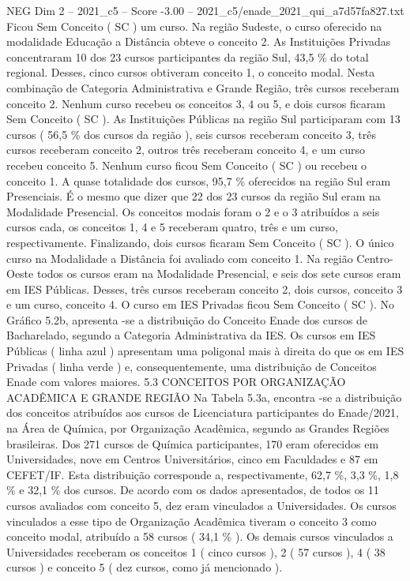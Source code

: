 \begin{textsample}{NEG Dim 2 – 2021\_c5 – Score -3.00 – 2021\_c5/enade\_2021\_qui\_a7d57fa827.txt}
Ficou Sem Conceito ( SC ) um curso.
Na região Sudeste, o curso oferecido na modalidade Educação a Distância obteve o conceito 2.
As Instituições Privadas concentraram 10 dos 23 cursos participantes da região Sul, 43,5 \% do total regional.
Desses, cinco cursos obtiveram conceito 1, o conceito modal.
Nesta combinação de Categoria Administrativa e Grande Região, três cursos receberam conceito 2.
Nenhum curso recebeu os conceitos 3, 4 ou 5, e dois cursos ficaram Sem Conceito ( SC ).
As Instituições Públicas na região Sul participaram com 13 cursos ( 56,5 \% dos cursos da região ), seis cursos receberam conceito 3, três cursos receberam conceito 2, outros três receberam conceito 4, e um curso recebeu conceito 5.
Nenhum curso ficou Sem Conceito ( SC ) ou recebeu o conceito 1.
A quase totalidade dos cursos, 95,7 \% oferecidos na região Sul eram Presenciais.
É o mesmo que dizer que 22 dos 23 cursos da região Sul eram na Modalidade Presencial.
Os conceitos modais foram o 2 e o 3 atribuídos a seis cursos cada, os conceitos 1, 4 e 5 receberam quatro, três e um curso, respectivamente.
Finalizando, dois cursos ficaram Sem Conceito ( SC ).
O único curso na Modalidade a Distância foi avaliado com conceito 1.
Na região Centro-Oeste todos os cursos eram na Modalidade Presencial, e seis dos sete cursos eram em IES Públicas.
Desses, três cursos receberam conceito 2, dois cursos, conceito 3 e um curso, conceito 4.
O curso em IES Privadas ficou Sem Conceito ( SC ).
No Gráfico 5.2b, apresenta -se a distribuição do Conceito Enade dos cursos de Bacharelado, segundo a Categoria Administrativa da IES.
Os cursos em IES Públicas ( linha azul ) apresentam uma poligonal mais à direita do que os em IES Privadas ( linha verde ) e, consequentemente, uma distribuição de Conceitos Enade com valores maiores. 5.3 CONCEITOS POR ORGANIZAÇÃO ACADÊMICA E GRANDE REGIÃO Na Tabela 5.3a, encontra -se a distribuição dos conceitos atribuídos aos cursos de Licenciatura participantes do Enade/2021, na Área de Química, por Organização Acadêmica, segundo as Grandes Regiões brasileiras.
Dos 271 cursos de Química participantes, 170 eram oferecidos em Universidades, nove em Centros Universitários, cinco em Faculdades e 87 em CEFET/IF.
Esta distribuição corresponde a, respectivamente, 62,7 \%, 3,3 \%, 1,8 \% e 32,1 \% dos cursos.
De acordo com os dados apresentados, de todos os 11 cursos avaliados com conceito 5, dez eram vinculados a Universidades.
Os cursos vinculados a esse tipo de Organização Acadêmica tiveram o conceito 3 como conceito modal, atribuído a 58 cursos ( 34,1 \% ).
Os demais cursos vinculados a Universidades receberam os conceitos 1 ( cinco cursos ), 2 ( 57 cursos ), 4 ( 38 cursos ) e conceito 5 ( dez cursos, como já mencionado ).

\end{textsample}
